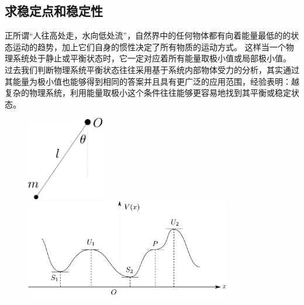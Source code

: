 \subsection{求稳定点和稳定性}
正所谓“人往高处走，水向低处流”，自然界中的任何物体都有向着能量最低的的状态运动的趋势，加上它们自身的惯性决定了所有物质的运动方式。
这样当一个物理系统处于静止或平衡状态时，它一定对应着所有能量取极小值或局部极小值。
过去我们判断物理系统平衡状态往往采用基于系统内部物体受力的分析，其实通过其能量为极小值也能够得到相同的答案并且具有更广泛的应用范围，经验表明：越复杂的物理系统，利用能量取极小这个条件往往能够更容易地找到其平衡或稳定状态。

\begin{figure}[hbtp]

\begin{minipage}[t]{0.5\linewidth}
\centering
\includegraphics[width = 0.3\textwidth]{images/cal-6.pdf}
\caption{}\label{fig: 微积分,摆的稳定性}
\end{minipage}
\begin{minipage}[t]{0.5\linewidth}
\centering
\includegraphics[width=0.8\textwidth]{images/cal-7.pdf} 
\caption{}\label{fig: 微积分,任意势能下的稳定性}
\end{minipage}

\end{figure}

